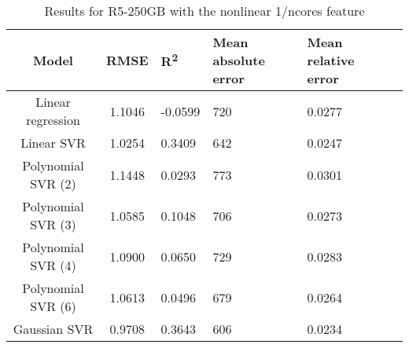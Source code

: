 \begin{table}[H]
\centering
\begin{adjustbox}{center}
\begin{tabular}{c | c M{1.2cm} M{2.5cm} M{2.5cm} M{1.8cm}}
Model & RMSE & R\textsuperscript{2} & Mean absolute error & Mean relative error \tabularnewline
\hline
Linear regression & 1.1046 & -0.0599 &    720 & 0.0277 \\
Linear SVR & 1.0254 & 0.3409 &    642 & 0.0247 \\
Polynomial SVR (2) & 1.1448 & 0.0293 &    773 & 0.0301 \\
Polynomial SVR (3) & 1.0585 & 0.1048 &    706 & 0.0273 \\
Polynomial SVR (4) & 1.0900 & 0.0650 &    729 & 0.0283 \\
Polynomial SVR (6) & 1.0613 & 0.0496 &    679 & 0.0264 \\
Gaussian SVR & 0.9708 & 0.3643 &    606 & 0.0234 \\
\end{tabular}
\end{adjustbox}
\\
\caption{Results for R5-250GB with the nonlinear 1/ncores feature}
\label{tab:all_nonlinear_R5_250}
\end{table}
